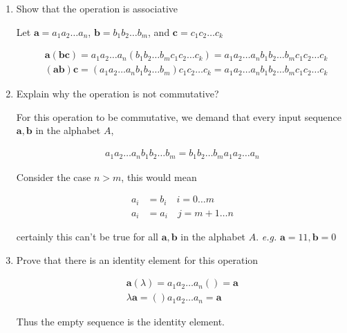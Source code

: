 \documentclass[nohyper,nobib]{tufte-handout}
\theoremstyle{definition}
\theoremstyle{remark}
\begin{document}
\begin{enumerate}
    \item Show that the operation is associative

        Let $\mathbf{a} = a_1a_2 \ldots a_n$,  $\mathbf{b} = b_1b_2 \ldots b_m$, and $\mathbf{c} = c_1c_2 \ldots c_k$

        \begin{align}
            &\mathbf{a}(\mathbf{bc})= a_1a_2\ldots a_n (b_1b_2\ldots b_m c_1c_2\ldots c_k) = a_1a_2\ldots a_nb_1b_2\ldots b_m c_1c_2\ldots c_k \nonumber \\
            &(\mathbf{ab})\mathbf{c} = (a_1a_2\ldots a_n b_1b_2\ldots b_m) c_1c_2\ldots c_k = a_1a_2\ldots a_n b_1b_2\ldots b_m c_1c_2\ldots c_k
        \end{align}
    \item Explain why the operation is not commutative?

        For this operation to be commutative, we demand that every input sequence $\mathbf{a}, \mathbf{b}$ in the alphabet $A$,

        \begin{align}
            a_1a_2\ldots a_nb_1b_2\ldots b_m = b_1b_2\ldots b_ma_1a_2\ldots a_n
        \end{align}

        Consider the case $n > m$, this would mean

        \begin{align}
            a_i &= b_i  \quad i=0 \ldots m \nonumber \\
            a_i &= a_i  \quad j=m+1 \ldots n
        \end{align}

        certainly this can't be true for all $\mathbf{a}, \mathbf{b}$ in the alphabet $A$. \emph{e.g.} $\mathbf{a} = 11, \mathbf{b} = 0$

    \item  Prove that there is an identity element for this operation

        \begin{align}
            \mathbf{a}(\lambda) = a_1a_2\ldots a_n()  = \mathbf{a} \nonumber \\
            \lambda\mathbf{a} = ()a_1a_2 \ldots a_n = \mathbf{a}
        \end{align}

        Thus the empty sequence is the identity element.

\end{enumerate}
\end{document}
